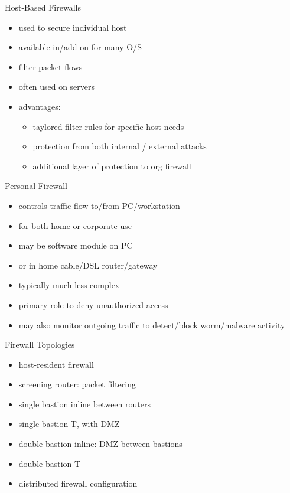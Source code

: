 \documentclass{beamer}
\begin{document}
\begin{frame}{Host-Based Firewalls}
  \begin{itemize}
  \item used to secure individual host 
  \item available in/add-on for many O/S 
  \item filter packet flows 
  \item often used on servers 
  \item advantages: 
    \begin{itemize}
    \item taylored filter rules for specific host needs 
    \item protection from both internal / external attacks 
    \item additional layer of protection to org firewall 
    \end{itemize}
  \end{itemize}
\end{frame}

\begin{frame}{Personal Firewall}
  \begin{itemize}
  \item controls traffic flow to/from PC/workstation 
  \item for both home or corporate use 
  \item may be software module on PC 
  \item or in home cable/DSL router/gateway 
  \item typically much less complex 
  \item primary role to deny unauthorized access 
  \item may also monitor outgoing traffic to detect/block 
    worm/malware activity
  \end{itemize}
\end{frame}

\begin{frame}{Firewall Topologies}
  \begin{itemize}
  \item host-resident firewall 
  \item screening router: packet filtering 
  \item single bastion inline between routers 
  \item single bastion T, with DMZ 
  \item double bastion inline: DMZ between bastions 
  \item double bastion T 
  \item distributed firewall configuration
  \end{itemize}
\end{frame}
\end{document}
